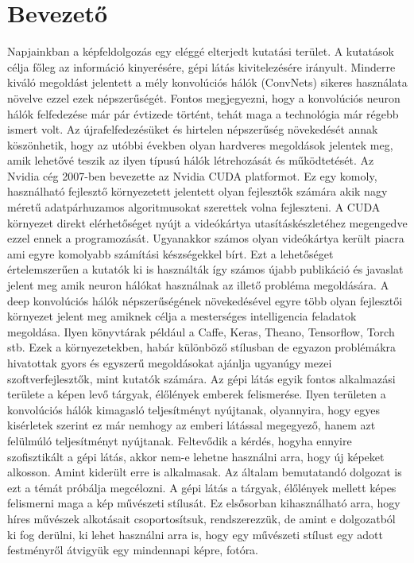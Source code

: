 \documentclass[12pt, a4paper, oneside]{book}
\theoremstyle{tetel}
\newcommand\capterro[1]{%
	\addcontentsline{tce}{chapter}{\protect\makebox[1.3em][l]{\thechapter.}#1}}
\newcommand\capteren[1]{%
	 \addcontentsline{tcen}{chapter}{\protect\makebox[1.3em][l]{\thechapter.}#1}}
\begin{document}

\chapter{Bevezető}
\capterro{Întroducere}
\capteren{Indroduction}

Napjainkban a képfeldolgozás egy eléggé elterjedt kutatási terület. A kutatások célja főleg az információ kinyerésére, gépi látás kivitelezésére irányult. Minderre kiváló megoldást jelentett a mély konvolúciós hálók (ConvNets)\cite{1}\cite{2} sikeres használata növelve ezzel ezek népszerűségét. Fontos megjegyezni, hogy a konvolúciós neuron hálók felfedezése már pár évtizede történt, tehát maga a technológia már régebb ismert volt. Az újrafelfedezésüket és hirtelen népszerűség növekedését annak köszönhetik, hogy az utóbbi években olyan hardveres megoldások jelentek meg, amik lehetővé teszik az ilyen típusú hálók létrehozását és működtetését. 
\newline 
\indent
Az Nvidia cég 2007-ben bevezette az Nvidia CUDA platformot\cite{3}. Ez egy komoly, használható fejlesztő környezetett jelentett olyan fejlesztők számára akik nagy méretű adatpárhuzamos algoritmusokat szerettek volna fejleszteni. A CUDA környezet direkt elérhetőséget nyújt a videókártya utasításkészletéhez megengedve ezzel ennek a programozását. Ugyanakkor számos olyan videókártya került piacra ami egyre komolyabb számítási készségekkel bírt. Ezt a lehetőséget értelemszerűen a kutatók ki is használták így számos újabb publikáció és javaslat jelent meg amik neuron hálókat használnak az illető probléma megoldására.
\newline
\indent
A deep konvolúciós hálók népszerűségének növekedésével egyre több olyan fejlesztői környezet jelent meg amiknek célja a mesterséges intelligencia feladatok megoldása. Ilyen könyvtárak például a Caffe\cite{4}, Keras\cite{5}, Theano\cite{6}, Tensorflow\cite{7}, Torch\cite{8} stb. Ezek a környezetekben, habár különböző stílusban de egyazon problémákra hivatottak gyors és egyszerű megoldásokat ajánlja ugyanúgy mezei szoftverfejlesztők, mint kutatók számára.
\newline
\indent
Az gépi látás egyik fontos alkalmazási területe a képen levő tárgyak, élőlények emberek felismerése. Ilyen területen a konvolúciós hálók kimagasló teljesítményt nyújtanak, olyannyira, hogy egyes kisérletek szerint ez már nemhogy az emberi látással megegyező, hanem azt felülmúló teljesítményt nyújtanak\cite{9}. Feltevődik a kérdés, hogyha ennyire szofisztikált a gépi látás, akkor nem-e lehetne használni arra, hogy új képeket alkosson. Amint kiderült erre is alkalmasak. Az általam bemutatandó dolgozat is ezt a témát próbálja megcélozni. A gépi látás a tárgyak, élőlények mellett képes felismerni maga a kép művészeti stílusát. Ez elsősorban kihasználható arra, hogy híres művészek alkotásait csoportosítsuk, rendszerezzük\cite{10}, de amint e dolgozatból ki fog derülni, ki lehet használni arra is, hogy egy művészeti stílust egy adott festményről átvigyük egy mindennapi képre, fotóra. 
\end{document}
